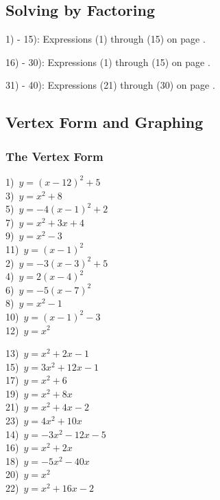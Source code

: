 \newpage

\subsection{Solving by Factoring}

{}\pp

1) - 15): Expressions (1) through (15) on page \pageref{ais1}.\pp

16) - 30): Expressions (1) through (15) on page \pageref{aisnot1}.\pp

31) - 40): Expressions (21) through (30) on page \pageref{aisnot1}.

\newpage

\subsection{Vertex Form and Graphing}

\subsubsection{The Vertex Form}

{}

\begin{multicols}{2}
  1)~$y=(x-12)^2+5 $\\
  3)~$y=x^2+8$\\
  5)~$y=-4(x-1)^2+2$\\
  7)~$y=x^2+3x+4$\\
  9)~$y=x^2-3$\\
  11)~$y=(x-1)^2$\\
  2)~$y=-3(x-3)^2+5 $\\
  4)~$y=2(x-4)^2 $\\
  6)~$y=-5(x-7)^2$\\
  8)~$y=x^2-1$\\
  10)~$y=(x-1)^2-3 $\\
  12)~$y=x^2$
\end{multicols}


{}

\begin{multicols}{2}
  13)~$y=x^2+2x-1 $\\
  15)~$y=3x^2+12x-1$\\
  17)~$y=x^2+6$\\
  19)~$y=x^2+8x$\\
  21)~$y=x^2+4x-2$\\
  23)~$y=4x^2+10x$\\
  14)~$y=-3x^2-12x-5 $\\
  16)~$y=x^2+2x$\\
  18)~$y=-5x^2-40x$\\
  20)~$y=x^2$\\
  22)~$y=x^2+16x-2 $
\end{multicols}


